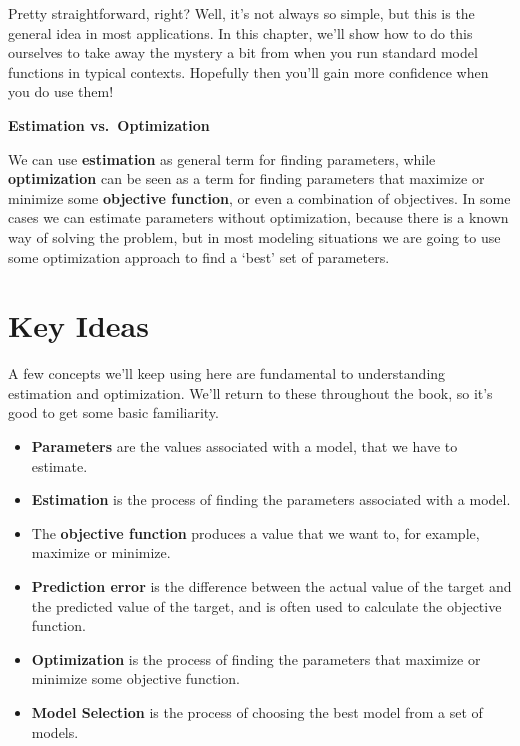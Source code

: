 \documentclass[
  letterpaper,
]{krantz}
\providecommand{\tightlist}{%
  \setlength{\itemsep}{0pt}\setlength{\parskip}{0pt}}\usepackage{longtable,booktabs,array}
\begin{document}
Pretty straightforward, right? Well, it's not always so simple, but this
is the general idea in most applications. In this chapter, we'll show
how to do this ourselves to take away the mystery a bit from when you
run standard model functions in typical contexts. Hopefully then you'll
gain more confidence when you do use them!

\begin{tcolorbox}[enhanced jigsaw, toprule=.15mm, arc=.35mm, rightrule=.15mm, bottomrule=.15mm, leftrule=.75mm, breakable, opacityback=0, colback=white, left=2mm]

\textbf{Estimation vs.~Optimization}\vspace{2mm}

We can use \textbf{estimation} as general term for finding parameters,
while \textbf{optimization} can be seen as a term for finding parameters
that maximize or minimize some \textbf{objective function}, or even a
combination of objectives. In some cases we can estimate parameters
without optimization, because there is a known way of solving the
problem, but in most modeling situations we are going to use some
optimization approach to find a `best' set of parameters.

\end{tcolorbox}

\section{Key Ideas}\label{sec-estim-key-ideas}

A few concepts we'll keep using here are fundamental to understanding
estimation and optimization. We'll return to these throughout the book,
so it's good to get some basic familiarity.

\begin{itemize}
\tightlist
\item
  \textbf{Parameters} are the values associated with a model, that we
  have to estimate.
\item
  \textbf{Estimation} is the process of finding the parameters
  associated with a model.
\item
  The \textbf{objective function} produces a value that we want to, for
  example, maximize or minimize.
\item
  \textbf{Prediction error} is the difference between the actual value
  of the target and the predicted value of the target, and is often used
  to calculate the objective function.
\item
  \textbf{Optimization} is the process of finding the parameters that
  maximize or minimize some objective function.
\item
  \textbf{Model Selection} is the process of choosing the best model
  from a set of models.
\end{itemize}
\end{document}
